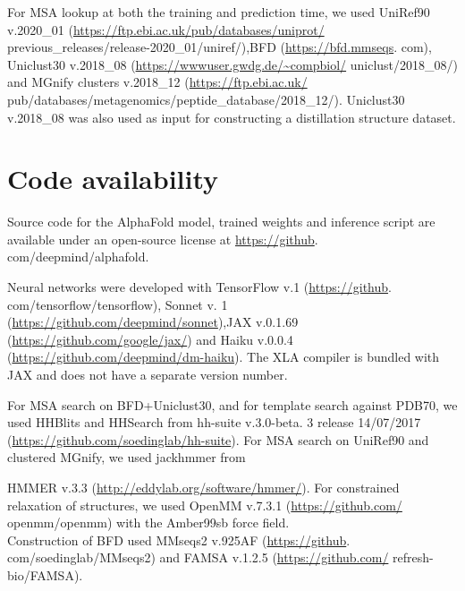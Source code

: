 \documentclass[10pt]{article}
\begin{document}
For MSA lookup at both the training and prediction time, we used UniRef90 v.2020\_01 (\href{https://ftp.ebi.ac.uk/pub/databases/uniprot/}{https://ftp.ebi.ac.uk/pub/databases/uniprot/} previous\_releases/release-2020\_01/uniref/),BFD (\href{https://bfd.mmseqs}{https://bfd.mmseqs}. com), Uniclust30 v.2018\_08 (\href{https://wwwuser.gwdg.de/~compbiol/}{https://wwwuser.gwdg.de/\~{}compbiol/} uniclust/2018\_08/) and MGnify clusters v.2018\_12 (\href{https://ftp.ebi.ac.uk/}{https://ftp.ebi.ac.uk/} pub/databases/metagenomics/peptide\_database/2018\_12/). Uniclust30 v.2018\_08 was also used as input for constructing a distillation structure dataset.

\section*{Code availability}
Source code for the AlphaFold model, trained weights and inference script are available under an open-source license at \href{https://github}{https://github}. com/deepmind/alphafold.

Neural networks were developed with TensorFlow v.1 (\href{https://github}{https://github}. com/tensorflow/tensorflow), Sonnet v. 1 (\href{https://github.com/deepmind/sonnet}{https://github.com/deepmind/sonnet}),JAX v.0.1.69 (\href{https://github.com/google/jax/}{https://github.com/google/jax/}) and Haiku v.0.0.4 (\href{https://github.com/deepmind/dm-haiku}{https://github.com/deepmind/dm-haiku}). The XLA compiler is bundled with JAX and does not have a separate version number.

For MSA search on BFD+Uniclust30, and for template search against PDB70, we used HHBlits and HHSearch from hh-suite v.3.0-beta. 3 release 14/07/2017 (\href{https://github.com/soedinglab/hh-suite}{https://github.com/soedinglab/hh-suite}). For MSA search on UniRef90 and clustered MGnify, we used jackhmmer from

HMMER v.3.3 (\href{http://eddylab.org/software/hmmer/}{http://eddylab.org/software/hmmer/}). For constrained relaxation of structures, we used OpenMM v.7.3.1 (\href{https://github.com/}{https://github.com/} openmm/openmm) with the Amber99sb force field.\\
Construction of BFD used MMseqs2 v.925AF (\href{https://github}{https://github}. com/soedinglab/MMseqs2) and FAMSA v.1.2.5 (\href{https://github.com/}{https://github.com/} refresh-bio/FAMSA).
\end{document}
